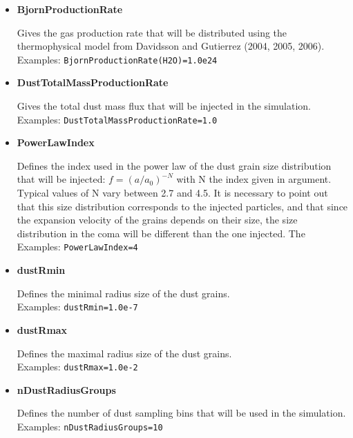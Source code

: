 \begin{itemize}
\item {\bf BjornProductionRate}

Gives the gas production rate that will be distributed using the thermophysical model from Davidsson and Gutierrez (2004, 2005, 2006).
\\Examples: {\tt  BjornProductionRate(H2O)=1.0e24}

\item {\bf DustTotalMassProductionRate}

Gives the total dust mass flux that will be injected in the simulation.
\\Examples: {\tt DustTotalMassProductionRate=1.0}

\item {\bf PowerLawIndex}

Defines the index used in the power law of the dust grain size distribution that will be injected: $f=\left(a/a_{0}\right)^{-N}$ with N the index given in argument. Typical values of N vary between 2.7 and 4.5. It is necessary to point out that this size distribution corresponds to the injected particles, and that since the expansion velocity of the grains depends on their size, the size distribution in the coma will be different than the one injected. The 
\\Examples: {\tt PowerLawIndex=4}

\item {\bf dustRmin}

Defines the minimal radius size of the dust grains.
\\Examples: {\tt dustRmin=1.0e-7}

\item {\bf dustRmax}

Defines the maximal radius size of the dust grains.
\\Examples: {\tt dustRmax=1.0e-2}

\item {\bf nDustRadiusGroups}

Defines the number of dust sampling bins that will be used in the simulation.
\\Examples: {\tt nDustRadiusGroups=10}

\end{itemize}